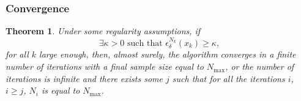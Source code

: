 \documentclass{beamer}
\newtheorem{theo}{Theorem}
\begin{document}
\begin{frame}
\frametitle{Convergence}

\begin{theo}
Under some regularity assumptions, if
\[
\exists \kappa > 0\text{ such that }
\epsilon_{\delta}^{N_k}(x_k) \geq \kappa,
\]
for all $k$ large enough, then, almost surely, the algorithm converges in a finite number of iterations with a final sample size equal to $N_{\max}$, or the number of iterations is infinite and there exists some $j$ such that for all the iterations $i$, $i \geq j$, $N_i$ is equal to $N_{\max}$.
\end{theo}

\end{frame}
\end{document}
